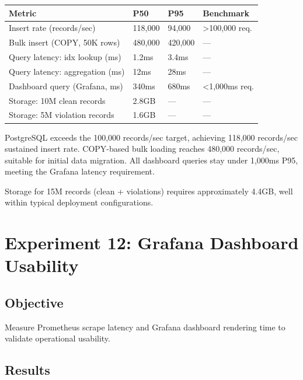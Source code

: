 \begin{longtable}{|m{4cm}|m{3cm}|m{4cm}|m{3cm}|}
\hline
\textbf{Metric} & \textbf{P50} & \textbf{P95} & \textbf{Benchmark} \\ \hline
Insert rate (records/sec) & 118,000 & 94,000 & >100,000 req. \\ \hline
Bulk insert (COPY, 50K rows) & 480,000 & 420,000 & --- \\ \hline
Query latency: idx lookup (ms) & 1.2ms & 3.4ms & --- \\ \hline
Query latency: aggregation (ms) & 12ms & 28ms & --- \\ \hline
Dashboard query (Grafana, ms) & 340ms & 680ms & <1,000ms req. \\ \hline
Storage: 10M clean records & 2.8GB & --- & --- \\ \hline
Storage: 5M violation records & 1.6GB & --- & --- \\ \hline
\end{longtable}

PostgreSQL exceeds the 100,000 records/sec target, achieving 118,000 records/sec sustained insert rate. COPY-based bulk loading reaches 480,000 records/sec, suitable for initial data migration. All dashboard queries stay under 1,000ms P95, meeting the Grafana latency requirement.

Storage for 15M records (clean + violations) requires approximately 4.4GB, well within typical deployment configurations.

\section{Experiment 12: Grafana Dashboard Usability}

\subsection{Objective}

Measure Prometheus scrape latency and Grafana dashboard rendering time to validate operational usability.

\subsection{Results}

